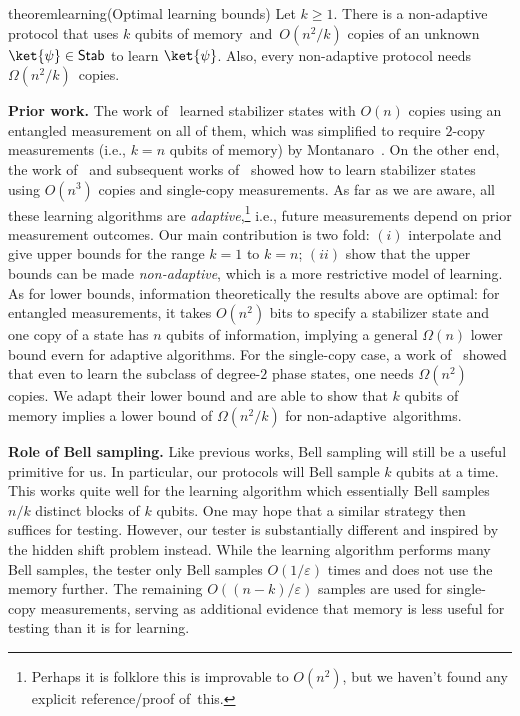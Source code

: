 \documentclass[11pt]{article}
\newcommand{\eps}{\varepsilon}
\newcommand{\Sh}{\ensuremath{\textsf{Stab}}}
\begin{document}
\begin{restatable}{theorem}{learning}{(Optimal learning bounds)}\label{thm:stablearning}
Let $k\geq 1$. There is a non-adaptive protocol that uses $k$ qubits of memory~and~$O(n^2/k)$ copies of an unknown $\ket{\psi}\in \Sh$ to learn $\ket{\psi}$. Also, every non-adaptive protocol needs  $\Omega(n^2/k)$~copies.
\end{restatable}

\textbf{Prior work.} The work of~\cite{aaronsontalk} learned stabilizer states with $O(n)$ copies using an entangled measurement on all of them, which was  simplified to require $2$-copy measurements (i.e., $k=n$ qubits of memory) by Montanaro~\cite{montanaro2017learning}. On the other end, the work of~\cite{aaronsontalk} and subsequent works of~\cite{grewal2025efficient,chia2024efficient} showed how to learn stabilizer states using $O(n^3)$ copies and single-copy measurements. As far as we are aware, all these learning algorithms are \emph{adaptive},\footnote{Perhaps it is folklore this is improvable  to $O(n^2)$, but we haven't found any explicit reference/proof of~this.} i.e., future measurements depend on prior measurement outcomes. Our main contribution is two fold: $(i)$ interpolate and give upper bounds for the range  $k=1$ to  $k=n$; $(ii)$ show that the upper bounds can be made \emph{non-adaptive}, which is a more restrictive model of learning. As for lower bounds, information theoretically the results above are optimal: for  entangled measurements, it takes $O(n^2)$ bits to specify a stabilizer state and one copy of a state has $n$ qubits of information, implying a general $\Omega(n)$ lower bound evern for adaptive algorithms. For the single-copy case, a work of~\cite{arunachalam2022optimal} showed that even to learn the subclass of degree-$2$ phase states, one needs $\Omega(n^2)$ copies. We adapt their lower bound and are able to show that $k$ qubits of memory implies a lower bound of $\Omega(n^2/k)$ for non-adaptive~algorithms.

\textbf{Role of Bell sampling.} Like previous works, Bell sampling will still be a useful primitive for us. In particular, our protocols will Bell sample $k$ qubits at a time. This works quite well for the learning algorithm which essentially Bell samples $n/k$ distinct blocks of $k$ qubits. One may hope that a similar strategy then suffices for testing. However, our tester is substantially different and inspired by the hidden shift problem instead. While the learning algorithm performs many Bell samples, the tester only Bell samples $O(1/\eps)$ times and does not use the memory further. The remaining $O((n-k)/\eps)$ samples are used for single-copy measurements, serving as additional evidence that memory is less useful for testing than it is for learning.
\end{document}
